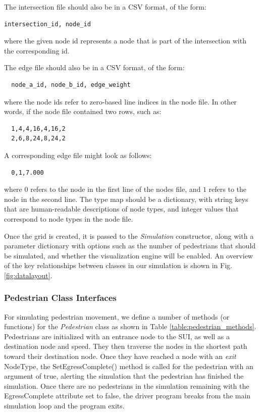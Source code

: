 \documentclass[12pt]{article}
\begin{document}
The intersection file should also be in a CSV format, of the form:

\begin{lstlisting}
intersection_id, node_id
\end{lstlisting}

where the given node id represents a node that is part of the intersection with the corresponding id.

The edge file should also be in a CSV format, of the form:\\

\begin{lstlisting}
  node_a_id, node_b_id, edge_weight
\end{lstlisting}

where the node ids refer to zero-based line indices in the node file. In other
words, if the node file contained two rows, such as:

\begin{lstlisting}
  1,4,4,16,4,16,2
  2,6,8,24,8,24,2
\end{lstlisting}

A corresponding edge file might look as follows:

\begin{lstlisting}
  0,1,7.000
\end{lstlisting}

where $0$ refers to the node in the first line of the nodes file, and $1$ refers
to the node in the second line. The type map should be a dictionary, with
string keys that are human-readable descriptions of node types, and integer
values that correspond to node types in the node file.

Once the grid is created, it is passed to the \textit{Simulation} constructor,
along with a parameter dictionary with options such as the number of pedestrians
that should be simulated, and whether the visualization engine will be enabled.
An overview of the key relationships between classes in our simulation is shown
in Fig. \ref{fig:datalayout}.

\subsubsection{Pedestrian Class Interfaces}
For simulating pedestrian movement, we define a number of methods (or functions)
for the \textit{Pedestrian} class as
shown in Table \ref{table:pedestrian_methods}. Pedestrians are initialized with
an entrance node to the SUI, as well as a destination node and speed. They then
traverse the nodes in the shortest path toward their destination node. Once
they have reached a node with an \textit{exit} NodeType, the
SetEgressComplete() method is called for the pedestrian with an argument of
true, alerting the simulation that the pedestrian has finished the simulation.
Once there are no pedestrians in the simulation remaining with the
EgressComplete attribute set to false, the driver program breaks from the main
simulation loop and the program exits.
\end{document}
